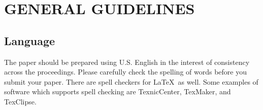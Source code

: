 \documentclass{wscpaperproc}
\theoremstyle{wsc}
\begin{document}
%

\section{GENERAL GUIDELINES}

\subsection{Language}
The paper should be prepared using U.S. English in the interest of consistency across the proceedings. Please carefully check the spelling of words before you submit your paper. There are spell checkers for \LaTeX\ as well.
Some examples of software which supports spell checking are TexnicCenter, TexMaker, and TexClipse.
\end{document}
